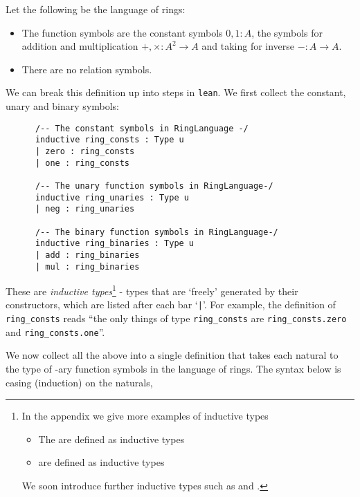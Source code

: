 \begin{dfn}
    Let the following be the language of rings:
    \begin{itemize}
        \item The function symbols are the constant symbols $0, 1 : A$,
        the symbols for addition and multiplication $+ , \times : A^2 \to A$
        and taking for inverse $- : A \to A$.
        \item There are no relation symbols.
    \end{itemize}

    We can break this definition up into steps in \texttt{lean}.
    We first collect the constant, unary and binary symbols:

    \begin{lstlisting}
      /-- The constant symbols in RingLanguage -/
      inductive ring_consts : Type u
      | zero : ring_consts
      | one : ring_consts

      /-- The unary function symbols in RingLanguage-/
      inductive ring_unaries : Type u
      | neg : ring_unaries

      /-- The binary function symbols in RingLanguage-/
      inductive ring_binaries : Type u
      | add : ring_binaries
      | mul : ring_binaries\end{lstlisting}

    These are \textit{inductive types}\footnote{
    In the appendix we give more examples of inductive types
    \begin{itemize}
      \item The  are defined as inductive types
      \item {} are defined as inductive types
    \end{itemize}
    We soon introduce further inductive types such as
     and . } -
    types that are `freely' generated by their constructors,
    which are listed after each bar `\texttt{|}'.
    For example, the definition of \texttt{ring\_consts} reads
    ``the only things of type \texttt{ring\_consts} are
    \texttt{ring\_consts.zero} and \texttt{ring\_consts.one}''.

    We now collect all the above into a single definition 
    that takes each natural  to the type of -ary
    function symbols in the language of rings.
    The syntax below is casing (induction) on the naturals,


\end{dfn}
